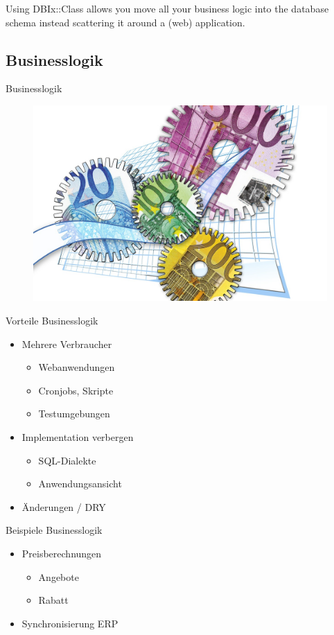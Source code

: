 Using DBIx::Class allows you move all your business logic
into the database schema instead scattering it around a (web)
application.

\subsection{Businesslogik}
\begin{frame}{Businesslogik}
\begin{figure}[!ht]
\centering
\includegraphics[width=0.75\linewidth]{img/business-logic.jpg}
\end{figure}
\end{frame}

\begin{frame}{Vorteile Businesslogik}
\begin{itemize}
\item Mehrere Verbraucher
\begin{itemize}
\item Webanwendungen
\item Cronjobs, Skripte
\item Testumgebungen
\end{itemize}
\item Implementation verbergen
\begin{itemize}
\item SQL-Dialekte
\item Anwendungsansicht
\end{itemize}
\item Änderungen / DRY
\end{itemize}
\end{frame}

\begin{frame}{Beispiele Businesslogik}
\begin{itemize}
\item Preisberechnungen
\begin{itemize}
\item Angebote
\item Rabatt
\end{itemize}
\item Synchronisierung ERP
\end{itemize}
\end{frame}

